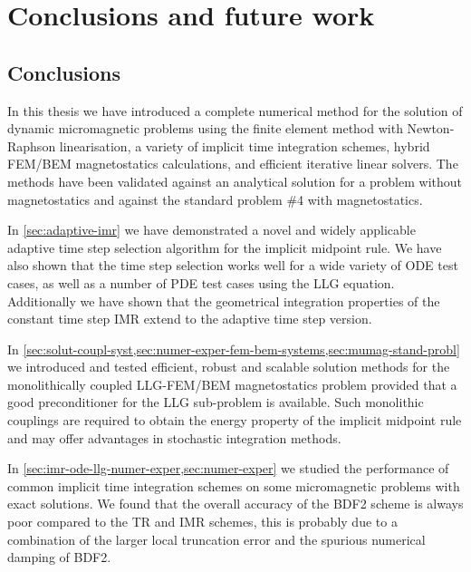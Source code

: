 \chapter{Conclusions and future work}

\section{Conclusions}

In this thesis we have introduced a complete numerical method for the solution of dynamic micromagnetic problems using the finite element method with Newton-Raphson linearisation, a variety of implicit time integration schemes, hybrid FEM/BEM magnetostatics calculations, and efficient iterative linear solvers.
The methods have been validated against an analytical solution for a problem without magnetostatics and against the \mumag standard problem \#4 with magnetostatics.

In \cref{sec:adaptive-imr} we have demonstrated a novel and widely applicable adaptive time step selection algorithm for the implicit midpoint rule.
We have also shown that the time step selection works well for a wide variety of ODE test cases, as well as a number of PDE test cases using the LLG equation.
Additionally we have shown that the geometrical integration properties of the constant time step IMR extend to the adaptive time step version.

In \cref{sec:solut-coupl-syst,sec:numer-exper-fem-bem-systems,sec:mumag-stand-probl} we introduced and tested efficient, robust and scalable solution methods for the monolithically coupled LLG-FEM/BEM magnetostatics problem provided that a good preconditioner for the LLG sub-problem is available.
Such monolithic couplings are required to obtain the energy property of the implicit midpoint rule and may offer advantages in stochastic integration methods.

In \cref{sec:imr-ode-llg-numer-exper,sec:numer-exper} we studied the performance of common implicit time integration schemes on some micromagnetic problems with exact solutions.
We found that the overall accuracy of the BDF2 scheme is always poor compared to the TR and IMR schemes, this is probably due to a combination of the larger local truncation error and the spurious numerical damping of BDF2.

